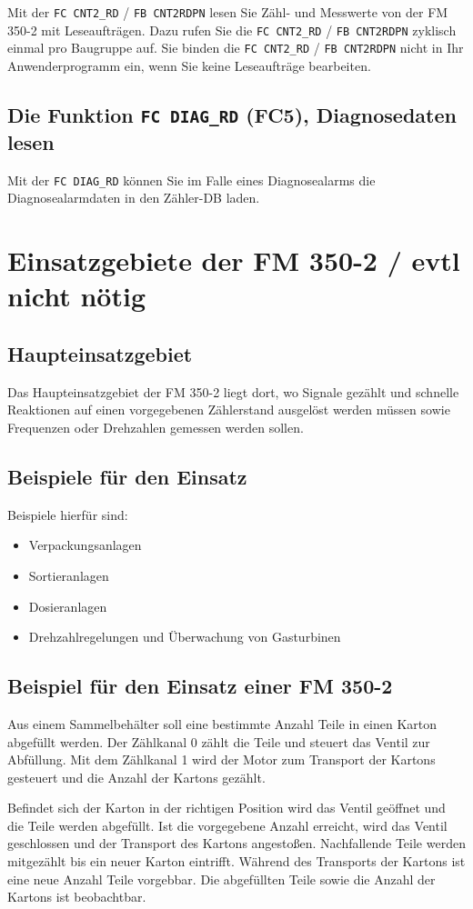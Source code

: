 Mit der \texttt{FC CNT2\_RD} / \texttt{FB CNT2RDPN} lesen Sie Zähl- und Messwerte von der FM 350-2 
mit Leseaufträgen. Dazu rufen Sie die \texttt{FC CNT2\_RD} / \texttt{FB CNT2RDPN} zyklisch einmal pro 
Baugruppe auf.  
Sie binden die \texttt{FC CNT2\_RD} / \texttt{FB CNT2RDPN} nicht in Ihr Anwenderprogramm ein, wenn 
Sie keine Leseaufträge bearbeiten.

\subsection{Die Funktion \texttt{FC DIAG\_RD} (FC5), Diagnosedaten lesen}

Mit der \texttt{FC DIAG\_RD} können Sie im Falle eines Diagnosealarms die Diagnosealarmdaten in 
den Zähler-DB laden.


\section{Einsatzgebiete der FM 350-2 / evtl nicht nötig}

\subsection{Haupteinsatzgebiet} Das Haupteinsatzgebiet der FM 350-2 liegt dort, wo Signale gezählt und schnelle Reaktionen auf einen vorgegebenen Zählerstand ausgelöst werden müssen sowie Frequenzen oder Drehzahlen gemessen werden sollen.

\subsection{Beispiele für den Einsatz} Beispiele hierfür sind: \begin{itemize} \item Verpackungsanlagen \item Sortieranlagen \item Dosieranlagen \item Drehzahlregelungen und Überwachung von Gasturbinen \end{itemize}

\subsection{Beispiel für den Einsatz einer FM 350-2} Aus einem Sammelbehälter soll eine bestimmte Anzahl Teile in einen Karton abgefüllt werden. Der Zählkanal 0 zählt die Teile und steuert das Ventil zur Abfüllung. Mit dem Zählkanal 1 wird der Motor zum Transport der Kartons gesteuert und die Anzahl der Kartons gezählt.

Befindet sich der Karton in der richtigen Position wird das Ventil geöffnet und die Teile werden abgefüllt. Ist die vorgegebene Anzahl erreicht, wird das Ventil geschlossen und der Transport des Kartons angestoßen. Nachfallende Teile werden mitgezählt bis ein neuer Karton eintrifft.
Während des Transports der Kartons ist eine neue Anzahl Teile vorgebbar. Die abgefüllten Teile sowie die Anzahl der Kartons ist beobachtbar. 
\fi